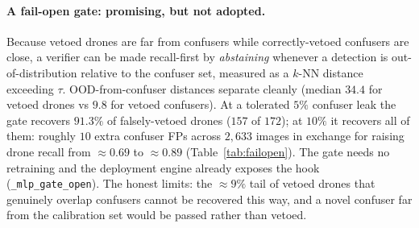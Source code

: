 \paragraph{A fail-open gate: promising, but not adopted.}
Because vetoed drones are far from confusers while correctly-vetoed confusers are close, a verifier can be made recall-first by \emph{abstaining} whenever a detection is out-of-distribution relative to the confuser set, measured as a $k$-NN distance exceeding $\tau$. OOD-from-confuser distances separate cleanly (median $34.4$ for vetoed drones vs $9.8$ for vetoed confusers). At a tolerated $5\%$ confuser leak the gate recovers $91.3\%$ of falsely-vetoed drones ($157$ of $172$); at $10\%$ it recovers all of them: roughly $10$ extra confuser FPs across $2{,}633$ images in exchange for raising drone recall from ${\approx}0.69$ to ${\approx}0.89$ (Table~\ref{tab:failopen}). The gate needs no retraining and the deployment engine already exposes the hook (\texttt{\_mlp\_gate\_open}). The honest limits: the ${\approx}9\%$ tail of vetoed drones that genuinely overlap confusers cannot be recovered this way, and a novel confuser far from the calibration set would be passed rather than vetoed.

